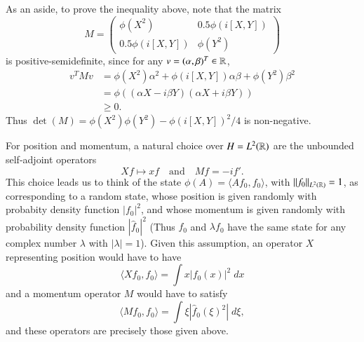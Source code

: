 \begin{remark}

As an aside, to prove the inequality above, note that the matrix
%
\[ M = \begin{pmatrix} \phi(X^2) & 0.5 \phi(i [X,Y]) \\ 0.5 \phi(i[X,Y]) & \phi(Y^2) \end{pmatrix} \]
%
is positive-semidefinite, since for any $v = (\alpha,\beta)^T \in \operatorname{\mathbb{R}}$,
%
\begin{align*}
	v^T M v &= \phi(X^2) \alpha^2 + \phi(i[X,Y]) \alpha \beta + \phi(Y^2) \beta^2\\
	&= \phi((\alpha X - i \beta Y)(\alpha X + i \beta Y))\\
	&\geq 0.
\end{align*}
%
Thus $\det(M) = \phi(X^2) \phi(Y^2) - \phi(i[X,Y])^2 / 4$ is non-negative.
\end{remark}

For position and momentum, a natural choice over $H = L^2(\operatorname{\mathbb{R}})$ are the unbounded self-adjoint operators
%
\[ Xf \mapsto x f \quad\text{and}\quad Mf = -i f'. \]
%
This choice leads us to think of the state $\phi(A) = \langle Af_0, f_0 \rangle$, with $\| f_0 \|_{L^2(\operatorname{\mathbb{R}})} = 1$, as corresponding to a random state, whose position is given randomly with probabity density function $|f_0|^2$, and whose momentum is given randomly with probability density function $|\widehat{f}_0|^2$ (Thus $f_0$ and $\lambda f_0$ have the same state for any complex number $\lambda$ with $|\lambda| = 1$). Given this assumption, an operator $X$ representing position would have to have
%
\[ \langle Xf_0, f_0 \rangle = \int x |f_0(x)|^2\; dx \]
%
and a momentum operator $M$ would have to satisfy
%
\[ \langle Mf_0, f_0 \rangle = \int \xi |\widehat{f}_0(\xi)^2|\; d\xi, \]
%
and these operators are precisely those given above.

